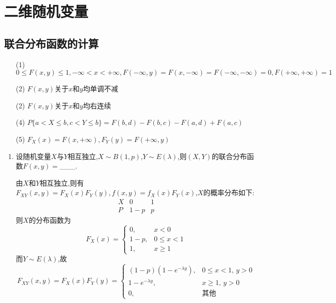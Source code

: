 \documentclass[12pt, a4paper, oneside, UTF8]{ctexbook}
\begin{document}
% 
\else
\fi
\chapter{二维随机变量}

\section{联合分布函数的计算}
\begin{remark}[联合分布函数的性质]
    \begin{enumerate}
    \item[(1)] $0\leq F(x,y)\leq 1,-\infty<x<+\infty, F(-\infty,y)=F(x,-\infty)=F(-\infty,-\infty)=0,F(+\infty,+\infty)=1$
    \item[(2)] $F(x,y)$关于$x$和$y$均单调不减
    \item[(2)] $F(x,y)$关于$x$和$y$均右连续
    \item[(4)] $P\{a<X\leq b,c<Y\leq b\}=F(b,d)-F(b,c)-F(a,d)+F(a,c)$ 
    \item[(5)] $F_{X}(x)=F(x,+\infty),F_{Y}(y)=F(+\infty, y)$  
    \end{enumerate}
\end{remark}

\begin{enumerate}[label=\arabic*.]
    \item 设随机变量$X$与$Y$相互独立,$X\sim B(1,p)$,$Y\sim E(\lambda)$,则$(X,Y)$的联合分布函数$F(x,y)=$\_\_\_.
    
    \begin{solution}
    由$X$和$Y$相互独立,则有$F_{XY}(x,y)=F_{X}(x)F_{Y}(y),f(x,y)=f_{X}(x)F_{Y}(x)$,$X$的概率分布如下:
    \[
    \begin{array}{c|c|c}
        X&0&1\\
        \hline
        P&1-p&p
    \end{array}
    \]
    则$X$的分布函数为
    \[F_{X}(x)=
    \begin{cases}
        0, & x < 0\\
        1-p, & 0\leq x < 1\\
        1, &x\geq 1
    \end{cases}
    \]
    而$Y\sim E(\lambda)$,故
    \[
    F_{XY}(x,y)=F_{X}(x)F_{Y}(y)=\begin{cases}
        (1-p)(1-e^{-\lambda y}), & 0\leq x < 1,\, y > 0 \\
        1-e^{-\lambda y}, & x\geq 1,\, y > 0\\
        0, & \text{其他}
    \end{cases}
    \]
    \end{solution}
\end{enumerate}
\end{document}
